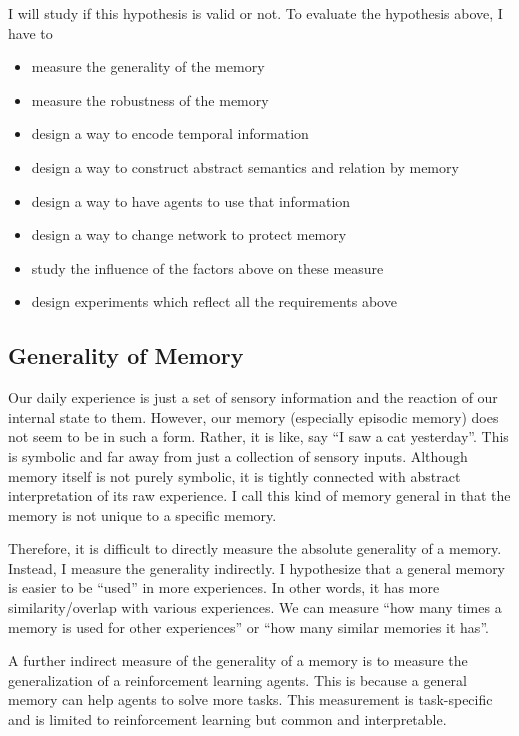 \documentclass[12pt]{article}
\begin{document}
I will study if this hypothesis is valid or not. To evaluate the hypothesis above, I have to 
\begin{itemize}
    \item measure the generality of the memory
    \item measure the robustness of the memory
    \item design a way to encode temporal information
    \item design a way to construct abstract semantics and relation by memory
    \item design a way to have agents to use that information
    \item design a way to change network to protect memory
    \item study the influence of the factors above on these measure
    \item design experiments which reflect all the requirements above
\end{itemize}

\subsection{Generality of Memory}
Our daily experience is just a set of sensory information and the reaction of our internal state to them. 
However, our memory (especially episodic memory) does not seem to be in such a form. Rather, it is like, say 
``I saw a cat yesterday''. This is symbolic and far away from just a collection of sensory inputs. Although 
memory itself is not purely symbolic, it is tightly connected with abstract interpretation of its raw experience.
I call this kind of memory general in that the memory is not unique to a specific memory.

Therefore, it is difficult to directly measure the absolute generality of a memory. Instead, I measure the 
generality indirectly. I hypothesize that a general memory is easier to be ``used'' in more experiences. In other 
words, it has more similarity/overlap with various experiences. We can measure ``how many times a memory is used for other experiences'' 
or ``how many similar memories it has''.

A further indirect measure of the generality of a memory is to measure the generalization of a reinforcement learning agents. 
This is because a general memory can help agents to solve more tasks. This measurement is task-specific and is limited to 
reinforcement learning but common and interpretable.
\end{document}
